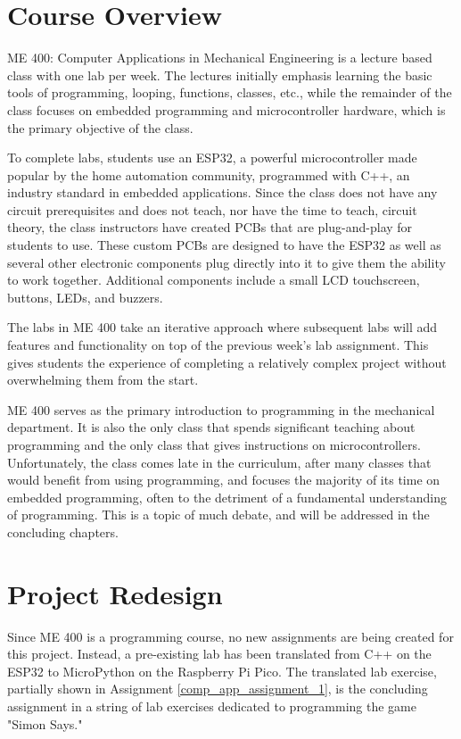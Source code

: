 \section{Course Overview}

ME 400: Computer Applications in Mechanical Engineering is a lecture based class with
one lab per week. The lectures initially emphasis learning the basic tools of
programming, looping, functions, classes, etc., while the remainder of the class
focuses on embedded programming and microcontroller hardware, which is the primary
objective of the class.

To complete labs, students use an ESP32, a powerful microcontroller made popular by
the home automation community, programmed with C++, an industry standard in embedded
applications. Since the class does not have any circuit prerequisites and does not 
teach, nor have the time to teach, circuit theory, the class instructors have created
PCBs that are plug-and-play for students to use. These custom PCBs are designed to have
the ESP32 as well as several other electronic components plug directly into it to
give them the ability to work together. Additional components include a small LCD 
touchscreen, buttons, LEDs, and buzzers. 

The labs in ME 400 take an iterative approach where subsequent labs will add features
and functionality on top of the previous week's lab assignment. This gives students
the experience of completing a relatively complex project without overwhelming them 
from the start. 

ME 400 serves as the primary introduction to programming in the mechanical department.
It is also the only class that spends significant teaching about programming and the
only class that gives instructions on microcontrollers. Unfortunately, the class comes
late in the curriculum, after many classes that would benefit from using programming,
and focuses the majority of its time on embedded programming, often to the detriment
of a fundamental understanding of programming. This is a topic of much debate, and
will be addressed in the concluding chapters.

\section{Project Redesign}

Since ME 400 is a programming course, no new assignments are being created for this
project. Instead, a pre-existing lab has been translated from C++ on the ESP32 to
MicroPython on the Raspberry Pi Pico. The translated lab exercise, partially shown in 
Assignment \ref{comp_app_assignment_1}, is the concluding
assignment in a string of lab exercises dedicated to programming the game "Simon Says."

